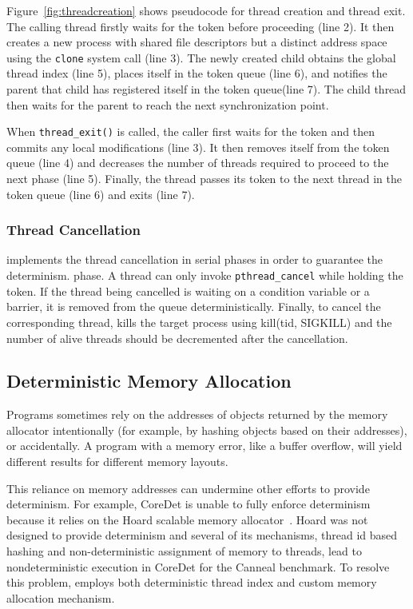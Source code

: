 Figure~\ref{fig:threadcreation} shows pseudocode for thread creation and thread exit. The calling thread firstly waits for the token before proceeding (line 2).  It then creates a new process with shared file descriptors but a distinct address space using the \texttt{clone} system call (line 3).  The newly created child obtains the global thread index (line 5), places itself in the token queue (line 6), and notifies the parent that child has registered itself in the token queue(line 7). The child thread then waits for the parent to reach the next synchronization point. 

When \texttt{thread\_exit()} is called, the caller first waits for the token and then commits any local modifications (line 3). It then removes itself from the token queue (line 4) and decreases the number of threads required to proceed to the next phase (line 5). Finally, the thread passes its token to the next thread in the token queue (line 6) and exits (line 7).

\subsubsection{Thread Cancellation}

\dthreads{} implements the thread cancellation in serial phases in order to guarantee the determinism. phase. A thread can only invoke \texttt{pthread\_cancel} while holding the token. If the thread being cancelled is waiting on a condition variable or a barrier, it is removed from the queue deterministically. Finally, to cancel the corresponding thread, \dthreads{} kills the target process using kill(tid, SIGKILL) and the number of alive threads should be decremented after the cancellation.

\subsection{Deterministic Memory Allocation}
Programs sometimes rely on the addresses of objects returned by the memory allocator intentionally (for example, by hashing objects based on their addresses), or accidentally. A program with a memory error, like a buffer overflow, will yield different results for different memory layouts.

This reliance on memory addresses can undermine other efforts to provide determinism. For example, CoreDet is unable to fully enforce determinism because it relies on the Hoard scalable memory allocator~\cite{Bergan:2010:CCR:1736020.1736029}. Hoard was not designed to provide determinism and several of its mechanisms, thread id based hashing and non-deterministic assignment of memory to threads, lead to nondeterministic execution in CoreDet for the Canneal benchmark. To resolve this problem, \dthreads{} employs both deterministic thread index and custom memory allocation mechanism. 

